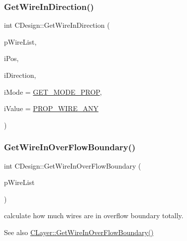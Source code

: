 \subsubsection{\texorpdfstring{GetWireInDirection()}{GetWireInDirection()}\hspace{0.1cm}{\footnotesize\ttfamily [2/2]}}
{\footnotesize\ttfamily int C\+Design\+::\+Get\+Wire\+In\+Direction (\begin{DoxyParamCaption}\item[{vector$<$ \mbox{\hyperlink{classCWire}{C\+Wire}} $\ast$ $>$ $\ast$}]{p\+Wire\+List,  }\item[{int}]{i\+Pos,  }\item[{int}]{i\+Direction,  }\item[{int}]{i\+Mode = {\ttfamily \mbox{\hyperlink{BoxRouter_8h_a678c4c2628bee05b15999bb00ded44d3}{G\+E\+T\+\_\+\+M\+O\+D\+E\+\_\+\+P\+R\+OP}}},  }\item[{int}]{i\+Value = {\ttfamily \mbox{\hyperlink{BoxRouter_8h_a3190814b5494277cd30ff3d03c8d4058}{P\+R\+O\+P\+\_\+\+W\+I\+R\+E\+\_\+\+A\+NY}}} }\end{DoxyParamCaption})}

\mbox{\label{classCDesign_acd4fc20284f55855b4e88d89cc03b058}} 
\subsubsection{\texorpdfstring{GetWireInOverFlowBoundary()}{GetWireInOverFlowBoundary()}}
{\footnotesize\ttfamily int C\+Design\+::\+Get\+Wire\+In\+Over\+Flow\+Boundary (\begin{DoxyParamCaption}\item[{hash\+\_\+map$<$ \mbox{\hyperlink{BoxRouter_8h_a280feb883e9d4a7edcc69c8bcb9f38f2}{A\+D\+D\+R\+E\+SS}}, int $>$ $\ast$}]{p\+Wire\+List }\end{DoxyParamCaption})}



calculate how much wires are in overflow boundary totally. 

\begin{DoxySeeAlso}{See also}
\mbox{\hyperlink{classCLayer_aa24a4614c4584721a8d10e43952c5af2}{C\+Layer\+::\+Get\+Wire\+In\+Over\+Flow\+Boundary()}} 
\end{DoxySeeAlso}
\mbox{\label{classCDesign_a9a2909717e3b6947c6d685e13088be6d}} 
